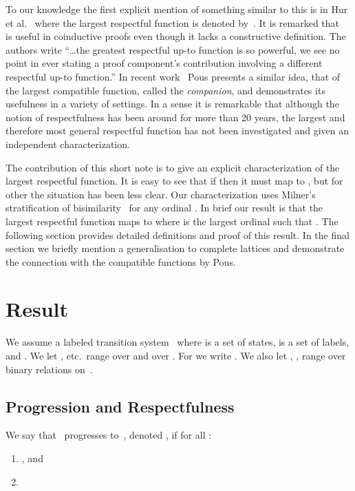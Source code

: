 \documentclass{CSML}
\theoremstyle{definition}
\begin{document}
To our knowledge the first explicit mention of something similar to
this is in Hur et al.~\cite{Hur2013} where the largest respectful
function is denoted by~. It is remarked that~ is
useful in coinductive proofs even though it lacks a constructive
definition. The authors write ``\ldots the greatest respectful up-to
function is so powerful, we see no point in ever stating a proof
component's contribution involving a different respectful up-to
function.''  In recent work~\cite{Pous2016} Pous presents a similar
idea, that of the largest compatible function, called the {\em
  companion}, and demonstrates its usefulness in a variety of
settings.  In a sense it is remarkable that although the notion of
respectfulness has been around for more than 20 years, the largest and
therefore most general respectful function has not been investigated
and given an independent characterization.

The contribution of this short note is to give an explicit
characterization of the largest respectful function. It is easy to see
that if  then it must map  to
, but for other  the situation has been less clear. Our
characterization uses Milner's stratification of
bisimilarity~\cite{Milner1989}  for any ordinal
. In brief our result is that the largest respectful function
maps  to  where  is the largest ordinal such
that .
The following section provides detailed definitions and proof of this
result. In the final section we briefly mention a generalisation to
complete lattices and demonstrate the connection with the compatible
functions by Pous.

\section{Result}

We assume a labeled transition system~ where  is a set of states,  is a
set of labels, and . We let ,  etc.\ range over  and 
over . For  we write
. We also let , ,  range over binary relations
on~.

\subsection{Progression and Respectfulness}
\begin{defi}[Progress]
\label{progress}
We say that~ progresses to~, denoted , if for all
:
\begin{enumerate}
\item , and
\item 
\end{enumerate}
\end{defi}
\end{document}

